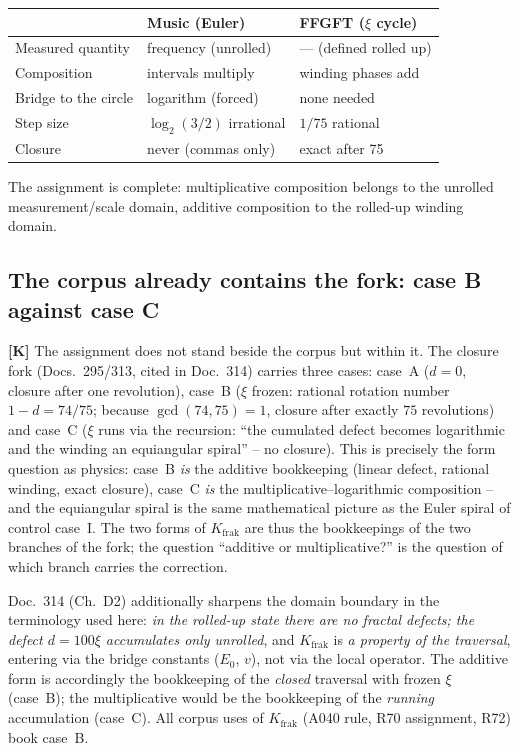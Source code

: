 \begin{center}
\begin{tabular}{lll}
\toprule
 & Music (Euler) & FFGFT ($\xi$ cycle) \\
\midrule
Measured quantity & frequency (unrolled) & --- (defined rolled up) \\
Composition & intervals multiply & winding phases add \\
Bridge to the circle & logarithm (forced) & none needed \\
Step size & $\log_2(3/2)$ irrational & $1/75$ rational \\
Closure & never (commas only) & exact after 75 \\
\bottomrule
\end{tabular}
\end{center}

The assignment is complete: multiplicative composition belongs to the
unrolled measurement/scale domain, additive composition to the
rolled-up winding domain.

\subsection{The corpus already contains the fork: case B against case C}

\textbf{[K]} The assignment does not stand beside the corpus but
within it. The closure fork (Docs.~295/313, cited in Doc.~314) carries
three cases: case~A ($d=0$, closure after one revolution), case~B
($\xi$ frozen: rational rotation number $1-d = 74/75$; because
$\gcd(74,75)=1$, closure after exactly $75$ revolutions) and case~C
($\xi$ runs via the recursion: \enquote{the cumulated defect becomes
logarithmic and the winding an equiangular spiral} -- no closure).
This is precisely the form question as physics: case~B \emph{is} the
additive bookkeeping (linear defect, rational winding, exact
closure), case~C \emph{is} the multiplicative--logarithmic
composition -- and the equiangular spiral is the same mathematical
picture as the Euler spiral of control case~I. The two forms of
$K_\text{frak}$ are thus the bookkeepings of the two branches of the
fork; the question \enquote{additive or multiplicative?} is the
question of which branch carries the correction.

Doc.~314 (Ch.~D2) additionally sharpens the domain boundary in the
terminology used here: \emph{in the rolled-up state there are no
fractal defects; the defect $d = 100\xi$ accumulates only unrolled},
and $K_\text{frak}$ is \emph{a property of the traversal}, entering
via the bridge constants ($E_0$, $v$), not via the local operator.
The additive form is accordingly the bookkeeping of the \emph{closed}
traversal with frozen $\xi$ (case~B); the multiplicative would be the
bookkeeping of the \emph{running} accumulation (case~C). All corpus
uses of $K_\text{frak}$ (A040 rule, R70 assignment, R72) book
case~B.

